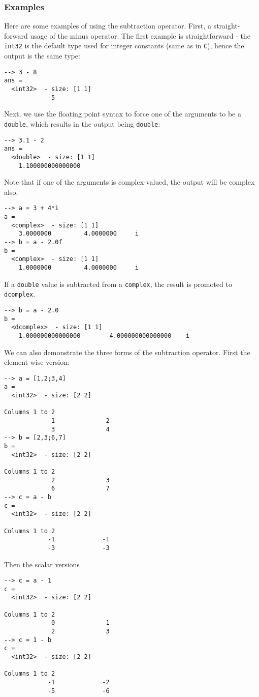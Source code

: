 \subsubsection{Examples}
Here are some examples of using the subtraction operator.  First, a 
straight-forward usage of the minus operator.  The first example
is straightforward - the \verb|int32| is the default type used for
integer constants (same as in \verb|C|), hence the output is the
same type:
\begin{verbatim}
--> 3 - 8
ans =
  <int32>  - size: [1 1]
            -5
\end{verbatim}
Next, we use the floating point syntax to force one of the arguments
to be a \verb|double|, which results in the output being \verb|double|:
\begin{verbatim}
--> 3.1 - 2
ans =
  <double>  - size: [1 1]
    1.100000000000000
\end{verbatim}
Note that if one of the arguments is complex-valued, the output will be
complex also.
\begin{verbatim}
--> a = 3 + 4*i
a =
  <complex>  - size: [1 1]
    3.0000000         4.0000000     i
--> b = a - 2.0f
b =
  <complex>  - size: [1 1]
    1.0000000         4.0000000     i
\end{verbatim}
If a \verb|double| value is subtracted from a \verb|complex|, the result is 
promoted to \verb|dcomplex|.
\begin{verbatim}
--> b = a - 2.0
b =
  <dcomplex>  - size: [1 1]
    1.000000000000000        4.000000000000000    i
\end{verbatim}
We can also demonstrate the three forms of the subtraction operator.  First
the element-wise version:
\begin{verbatim}
--> a = [1,2;3,4]
a =
  <int32>  - size: [2 2]
  
Columns 1 to 2
             1              2
             3              4
--> b = [2,3;6,7]
b =
  <int32>  - size: [2 2]
  
Columns 1 to 2
             2              3
             6              7
--> c = a - b
c =
  <int32>  - size: [2 2]
  
Columns 1 to 2
            -1             -1
            -3             -3
\end{verbatim}
Then the scalar versions
\begin{verbatim}
--> c = a - 1
c =
  <int32>  - size: [2 2]
  
Columns 1 to 2
             0              1
             2              3
--> c = 1 - b
c =
  <int32>  - size: [2 2]
  
Columns 1 to 2
            -1             -2
            -5             -6
\end{verbatim}
